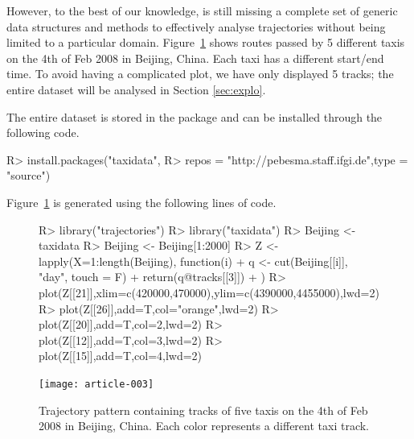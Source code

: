 \documentclass[article]{jss}
\begin{document}
However, to the best of our knowledge,  is still missing a complete set of generic data structures and methods to effectively analyse trajectories without being limited to a particular domain. Figure~\ref{taxitracks} shows routes passed by 5 different taxis on the 4th of Feb 2008 in Beijing, China. Each taxi has a different start/end time. To avoid having a complicated plot, we have only displayed 5 tracks; the entire dataset will be analysed in Section \ref{sec:explo}.

The entire dataset is stored in the  package    and can be installed through the following code.
\begin{Sinput}
R>   install.packages("taxidata", 
R>   repos = "http://pebesma.staff.ifgi.de",type = "source") 
\end{Sinput}

Figure~\ref{taxitracks} is generated using the following lines of code.

\begin{figure}[!h]
\begin{center}
\begin{Sinput}
R> library("trajectories")
R> library("taxidata")
R> Beijing <- taxidata
R> Beijing <- Beijing[1:2000]
R> Z <- lapply(X=1:length(Beijing), function(i){
+    q <-  cut(Beijing[[i]], "day", touch = F)
+    return(q@tracks[[3]])
+  })
R> plot(Z[[21]],xlim=c(420000,470000),ylim=c(4390000,4455000),lwd=2)
R> plot(Z[[26]],add=T,col="orange",lwd=2)
R> plot(Z[[20]],add=T,col=2,lwd=2)
R> plot(Z[[12]],add=T,col=3,lwd=2)
R> plot(Z[[15]],add=T,col=4,lwd=2)
\end{Sinput}
\texttt{[image: article-003]}
\end{center}
\caption{Trajectory pattern containing tracks of five taxis on the 4th of Feb 2008 in Beijing, China. Each color represents a different taxi track.}
\label{taxitracks}
\end{figure}
\end{document}
